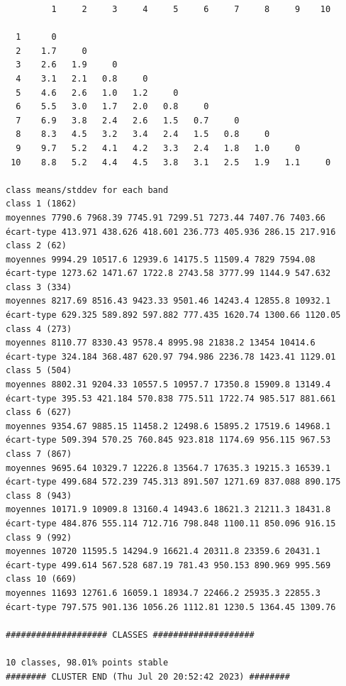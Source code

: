 \documentclass[land,article,submit,pdftex,moreauthors]{Definitions/mdpi}
\begin{document}
\begin{scriptsize}
\begin{verbatim}
         1     2     3     4     5     6     7     8     9    10

  1      0
  2    1.7     0
  3    2.6   1.9     0
  4    3.1   2.1   0.8     0
  5    4.6   2.6   1.0   1.2     0
  6    5.5   3.0   1.7   2.0   0.8     0
  7    6.9   3.8   2.4   2.6   1.5   0.7     0
  8    8.3   4.5   3.2   3.4   2.4   1.5   0.8     0
  9    9.7   5.2   4.1   4.2   3.3   2.4   1.8   1.0     0
 10    8.8   5.2   4.4   4.5   3.8   3.1   2.5   1.9   1.1     0

class means/stddev for each band
class 1 (1862)
moyennes 7790.6 7968.39 7745.91 7299.51 7273.44 7407.76 7403.66
écart-type 413.971 438.626 418.601 236.773 405.936 286.15 217.916
class 2 (62)
moyennes 9994.29 10517.6 12939.6 14175.5 11509.4 7829 7594.08
écart-type 1273.62 1471.67 1722.8 2743.58 3777.99 1144.9 547.632
class 3 (334)
moyennes 8217.69 8516.43 9423.33 9501.46 14243.4 12855.8 10932.1
écart-type 629.325 589.892 597.882 777.435 1620.74 1300.66 1120.05
class 4 (273)
moyennes 8110.77 8330.43 9578.4 8995.98 21838.2 13454 10414.6
écart-type 324.184 368.487 620.97 794.986 2236.78 1423.41 1129.01
class 5 (504)
moyennes 8802.31 9204.33 10557.5 10957.7 17350.8 15909.8 13149.4
écart-type 395.53 421.184 570.838 775.511 1722.74 985.517 881.661
class 6 (627)
moyennes 9354.67 9885.15 11458.2 12498.6 15895.2 17519.6 14968.1
écart-type 509.394 570.25 760.845 923.818 1174.69 956.115 967.53
class 7 (867)
moyennes 9695.64 10329.7 12226.8 13564.7 17635.3 19215.3 16539.1
écart-type 499.684 572.239 745.313 891.507 1271.69 837.088 890.175
class 8 (943)
moyennes 10171.9 10909.8 13160.4 14943.6 18621.3 21211.3 18431.8
écart-type 484.876 555.114 712.716 798.848 1100.11 850.096 916.15
class 9 (992)
moyennes 10720 11595.5 14294.9 16621.4 20311.8 23359.6 20431.1
écart-type 499.614 567.528 687.19 781.43 950.153 890.969 995.569
class 10 (669)
moyennes 11693 12761.6 16059.1 18934.7 22466.2 25935.3 22855.3
écart-type 797.575 901.136 1056.26 1112.81 1230.5 1364.45 1309.76

#################### CLASSES ####################

10 classes, 98.01% points stable
######## CLUSTER END (Thu Jul 20 20:52:42 2023) ########
\end{verbatim}
\end{scriptsize}
\end{document}
